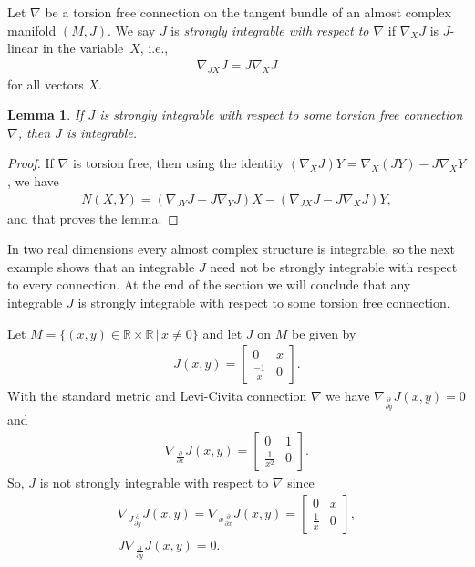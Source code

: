 \documentclass[pdftex]{sigma}
\newtheorem{lem}[thm]{Lemma}
\numberwithin{equation}{section}
\newcommand{\R}{\mathbb{R}}
\begin{document}
\begin{defn} \label{defn:strongint}
Let $\nabla$ be a torsion free connection on the tangent bundle of an almost complex manifold $(M,J)$. We say $J$ is \emph{strongly integrable with respect to $\nabla$} if $\nabla_X J$ is $J$-linear in the variable~$X$, i.e.,
\begin{gather*}
\nabla_{JX} J = J \nabla_X J
\end{gather*}
for all vectors $X$.
\end{defn}

\begin{lem} \label{lem;strongimpliesint}
If $J$ is strongly integrable with respect to some torsion free connection $\nabla$, then $J$ is integrable.
\end{lem}

\begin{proof}
If $\nabla$ is torsion free, then using the identity $(\nabla_X J) Y = \nabla_X (J Y) - J \nabla_X Y$, we have
\begin{gather}
N(X,Y) = (\nabla_{JY} J - J \nabla_Y J) X - (\nabla_{JX} J - J \nabla_X J)Y, \label{eq:Nnabla}
\end{gather}
and that proves the lemma.
\end{proof}

In two real dimensions every almost complex structure is integrable, so the next example shows that an integrable $J$ need not be strongly integrable with respect to every connection. At the end of the section we will conclude that any integrable $J$ is strongly integrable with respect to some torsion free connection.

\begin{ex} \label{ex;2dex}Let $M = \{ (x,y) \in \R \times \R\, | \, x \neq 0 \}$ and let
$J$ on $M$ be given by
\begin{gather*}
J(x,y) =
\begin{bmatrix}
0 & x \\
\frac {-1}{ x} & 0
\end{bmatrix}.
\end{gather*}
With the standard metric and Levi-Civita connection $\nabla$ we have $\nabla_{\frac{\partial }{\partial y}} J(x,y) = 0$
and
\begin{gather*}
\nabla_{\frac{\partial }{\partial x}} J(x,y) =
\begin{bmatrix}
0 & 1 \\
\frac{1}{ x^2} & 0
\end{bmatrix}.
\end{gather*}
So, $J$ is not strongly integrable with respect to $\nabla$ since
\begin{gather*}
 \nabla_{ J \frac{\partial }{\partial y}} J(x,y)= \nabla_{x \frac{\partial }{\partial x}} J(x,y) =
\begin{bmatrix}
0 & x \\
\frac{1}{ x} & 0
\end{bmatrix}, \\
J \nabla_{\frac{\partial }{\partial y}} J(x,y)= 0 .
\end{gather*}
\end{ex}
\end{document}
